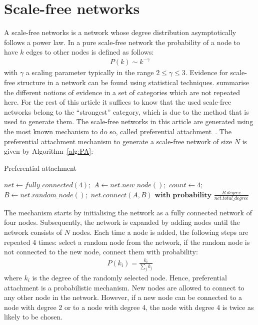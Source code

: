 \documentclass[11pt]{article}
\begin{document}
\section{Scale-free networks\label{sec:SF}}
A scale-free networks is a network whose degree distribution asymptotically follows a power law. In a pure scale-free
network the probability of a node to have $k$ edges to other nodes is defined as follows:
\begin{align}
    P(k) \sim k^{-\gamma}
\end{align}
with $\gamma$ a scaling parameter typically in the range $2 \leq \gamma \leq 3$. Evidence for scale-free structure in a
network can be found using statistical techniques.  summarise the different
notions of evidence in a set of categories which are not repeated here. For the rest of this article it suffices to
know that the used scale-free networks belong to the ``strongest'' category, which is due to the method that is used to
generate them. The scale-free networks in this article are generated using the most known mechanism to do so, called
preferential attachment~. The preferential attachment mechanism to
generate a scale-free network of size $N$ is given by Algorithm~\ref{alg:PA}:

\begin{algorithm}
    \caption{Preferential attachment \protect{}}\label{alg:PA}
    \begin{algorithmic}[1]
        \State $net \gets fully\_connected(4);$
        \State $A \gets net.new\_node();$
        \State $count \gets 4;$
        \State $B \gets net.random\_node();$
        \State $net.connect(A,B) \textbf{ with probability } \frac{B.degree}{net.total\_degree}$
        \EndIf
        \EndWhile
        \EndWhile
    \end{algorithmic}
\end{algorithm}
\noindent
The mechanism starts by initialising the network as a fully connected network of four nodes. Subsequently, the network
is expanded by adding nodes until the network consists of $N$ nodes. Each time a node is added, the following steps are
repeated 4 times: select a random node from the network, if the random node is not connected to the new node, connect
them with probability:
\begin{align*}
    P(k_i) = \frac{k_i}{\sum_{j} k_j}
\end{align*}
where $k_i$ is the degree of the randomly selected node. Hence, preferential attachment is a probabilistic mechanism.
New nodes are allowed to connect to any other node in the network. However, if a new node can be connected to a node
with degree 2 or to a node with degree 4, the node with degree 4 is twice as likely to be chosen.
\end{document}
